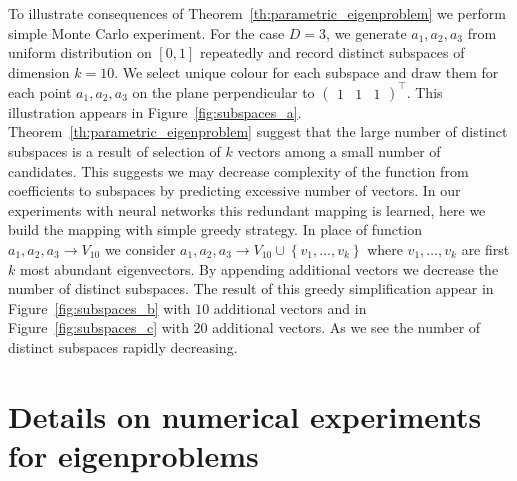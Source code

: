 \documentclass{article}
\begin{document}
To illustrate consequences of Theorem~\ref{th:parametric_eigenproblem} we perform simple Monte Carlo experiment. For the case $D=3$, we generate $a_1, a_2, a_3$ from uniform distribution on $[0, 1]$ repeatedly and record distinct subspaces of dimension $k=10$. We select unique colour for each subspace and draw them for each point $a_1, a_2, a_3$ on the plane perpendicular to $\begin{pmatrix}1 & 1 & 1\end{pmatrix}^\top$. This illustration appears in Figure~\ref{fig:subspaces_a}. Theorem~\ref{th:parametric_eigenproblem} suggest that the large number of distinct subspaces is a result of selection of $k$ vectors among a small number of candidates. This suggests we may decrease complexity of the function from coefficients to subspaces by predicting excessive number of vectors. In our experiments with neural networks this redundant mapping is learned, here we build the mapping with simple greedy strategy. In place of function $a_1,a_2,a_3\rightarrow V_{10}$ we consider $a_1,a_2,a_3\rightarrow V_{10}\cup \left\{v_1,\dots, v_k\right\}$ where $v_1, \dots, v_k$ are first $k$ most abundant eigenvectors. By appending additional vectors we decrease the number of distinct subspaces. The result of this greedy simplification appear in Figure~\ref{fig:subspaces_b} with $10$ additional vectors and in Figure~\ref{fig:subspaces_c} with $20$ additional vectors. As we see the number of distinct subspaces rapidly decreasing.

\section{Details on numerical experiments for eigenproblems}
\label{appendix:eigenproblems_numerics}
\end{document}

